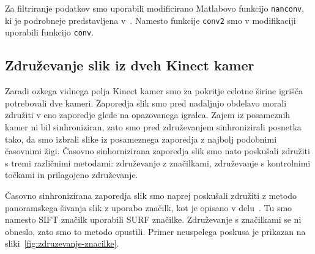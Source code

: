 Za filtriranje podatkov smo uporabili modificirano Matlabovo funkcijo \texttt{nanconv}, ki je podrobneje predstavljena v~\cite{kraus2017nanconv}. Namesto funkcije \texttt{conv2} smo v modifikaciji uporabili funkcijo \texttt{conv}.






\subsection{Združevanje slik iz dveh Kinect kamer}
Zaradi ozkega vidnega polja Kinect kamer smo za pokritje celotne širine igrišča potrebovali dve kameri. Zaporedja slik smo pred nadaljnjo obdelavo morali združiti v eno zaporedje glede na opazovanega igralca. Zajem iz posameznih kamer ni bil sinhroniziran, zato smo pred združevanjem sinhronizirali posnetka tako, da smo izbrali slike iz posameznega zaporedja z najbolj podobnimi časovnimi žigi. Časovno sinhornizirana zaporedja slik smo nato poskušali združiti s tremi različnimi metodami:  združevanje z značilkami, združevanje s kontrolnimi točkami in prilagojeno združevanje. 

Časovno sinhronizirana zaporedja slik smo naprej poskušali združiti z metodo panoramskega šivanja slik z uporabo značilk, kot je opisano v delu~\cite{brown2007automatic}. Tu smo namesto SIFT značilk uporabili SURF značilke.
Združevanje s značilkami se ni obneslo, zato smo to metodo opustili. Primer neuspelega poskusa je prikazan na sliki~\ref{fig:zdruzevanje-znacilke}.

